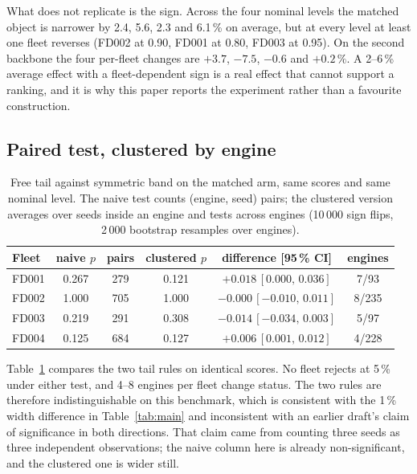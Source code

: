 \documentclass[journal]{IEEEtran}
\begin{document}
What does not replicate is the sign. Across the four nominal levels the matched object is
narrower by 2.4, 5.6, 2.3 and 6.1\,\% on average, but at every level at least one fleet reverses
(FD002 at 0.90, FD001 at 0.80, FD003 at 0.95). On the second backbone the four per-fleet changes
are $+3.7$, $-7.5$, $-0.6$ and $+0.2\,\%$. A 2--6\,\% average effect with a fleet-dependent sign
is a real effect that cannot support a ranking, and it is why this paper reports the experiment
rather than a favourite construction.

\subsection{Paired test, clustered by engine}\label{sec:paired}

\begin{table}[t]
\centering
\caption{Free tail against symmetric band on the matched arm, same scores and same nominal
level. The naive test counts (engine, seed) pairs; the clustered version averages over seeds
inside an engine and tests across engines (10\,000 sign flips, 2\,000 bootstrap resamples over
engines).}
\label{tab:paired}
\footnotesize
\setlength{\tabcolsep}{3pt}
\begin{tabular}{lccccc}
\toprule
Fleet & naive $p$ & pairs & clustered $p$ & difference [95\,\% CI] & engines\\
\midrule
FD001 & 0.267 & 279 & 0.121 & $+0.018\,[0.000,\,0.036]$ & 7/93\\
FD002 & 1.000 & 705 & 1.000 & $-0.000\,[-0.010,\,0.011]$ & 8/235\\
FD003 & 0.219 & 291 & 0.308 & $-0.014\,[-0.034,\,0.003]$ & 5/97\\
FD004 & 0.125 & 684 & 0.127 & $+0.006\,[0.001,\,0.012]$ & 4/228\\
\bottomrule
\end{tabular}
\end{table}

Table~\ref{tab:paired} compares the two tail rules on identical scores. No fleet rejects at
5\,\% under either test, and 4--8 engines per fleet change status. The two rules are therefore
indistinguishable on this benchmark, which is consistent with the 1\,\% width difference in
Table~\ref{tab:main} and inconsistent with an earlier draft's claim of significance in both
directions. That claim came from counting three seeds as three independent observations; the
naive column here is already non-significant, and the clustered one is wider still.
\end{document}
